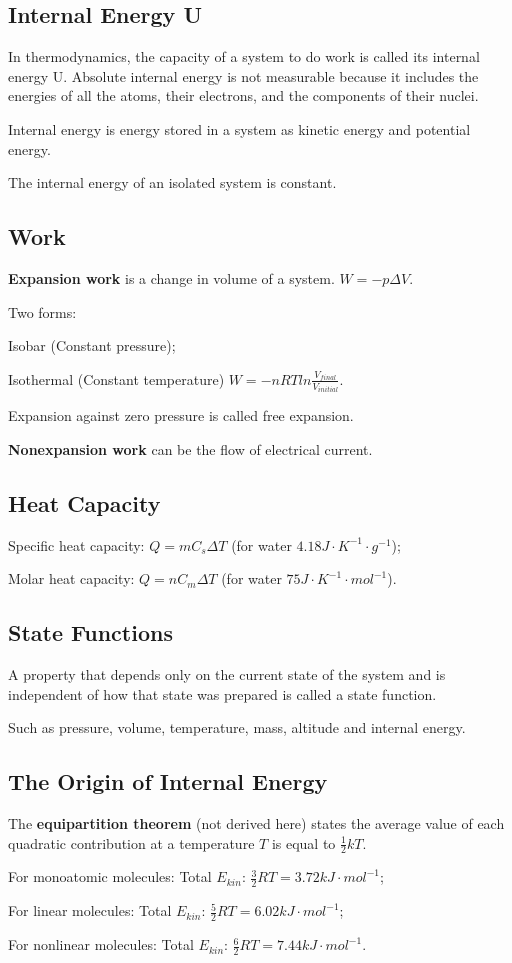 \documentclass[a4paper,12pt]{article}
\begin{document}
\subsection{Internal Energy U}
In thermodynamics, the capacity of a system to do work is called its internal energy U. Absolute internal energy is not measurable because it includes the energies of all the atoms, their electrons, and the components of their nuclei.\par
Internal energy is energy stored in a system as kinetic energy and potential energy.\par
The internal energy of an isolated system is constant.
\subsection{Work}
\textbf{Expansion work} is a change in volume of a system. $W=-p\Delta V$.\par
Two forms:\par Isobar (Constant pressure);\par Isothermal (Constant temperature) $W=-nRTln\frac{V_{final}}{V_{initial}}$.\par
Expansion against zero pressure is called free expansion.\par
\textbf{Nonexpansion work} can be the flow of electrical current.
\subsection{Heat Capacity}
Specific heat capacity: $Q = m C_{s} \Delta T$ (for water $4.18 J\cdot K^{-1}\cdot g^{-1}$);\par
Molar heat capacity: $Q = n C_{m} \Delta T$ (for water $75 J\cdot K^{-1}\cdot mol^{-1}$).
\subsection{State Functions}
A property that depends only on the current state of the system and is independent of how that state was prepared is called a state function.\par
Such as pressure, volume, temperature, mass, altitude and internal energy.
\subsection{The Origin of Internal Energy}
The \textbf{equipartition theorem} (not derived here) states the average value of each quadratic contribution at a temperature $T$ is equal to $\frac{1}{2}kT$.\par
For monoatomic molecules: Total $E_{kin}$: $\frac{3}{2}RT = 3.72 kJ\cdot mol^{-1}$;\par
For linear molecules: Total $E_{kin}$: $\frac{5}{2}RT = 6.02 kJ\cdot mol^{-1}$;\par
For nonlinear molecules: Total $E_{kin}$: $\frac{6}{2}RT = 7.44 kJ\cdot mol^{-1}$.
\end{document}
